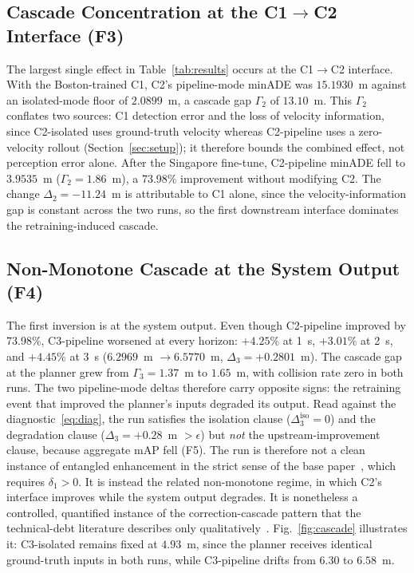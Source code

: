 \documentclass[conference]{IEEEtran}
\begin{document}
\subsection{Cascade Concentration at the C1$\to$C2 Interface (F3)}
The largest single effect in Table~\ref{tab:results} occurs at the C1$\to$C2
interface. With the Boston-trained C1, C2's pipeline-mode minADE was
$15.1930$~m against an isolated-mode floor of $2.0899$~m, a cascade gap
$\Gamma_2$ of $13.10$~m. This $\Gamma_2$ conflates two sources: C1 detection
error and the loss of velocity information, since C2-isolated uses ground-truth
velocity whereas C2-pipeline uses a zero-velocity rollout
(Section~\ref{sec:setup}); it therefore bounds the combined effect, not
perception error alone. After the Singapore fine-tune, C2-pipeline minADE fell
to $3.9535$~m ($\Gamma_2 = 1.86$~m), a 73.98\% improvement without modifying
C2. The change $\Delta_2 = -11.24$~m is attributable to C1 alone, since the
velocity-information gap is constant across the two runs, so the first
downstream interface dominates the retraining-induced cascade.

\subsection{Non-Monotone Cascade at the System Output (F4)}
The first inversion is at the system output. Even though C2-pipeline improved by
73.98\%, C3-pipeline worsened at every horizon: $+4.25\%$ at 1~s, $+3.01\%$ at
2~s, and $+4.45\%$ at 3~s ($6.2969$~m $\to 6.5770$~m, $\Delta_3 = +0.2801$~m).
The cascade gap at the planner grew from $\Gamma_3 = 1.37$~m to $1.65$~m, with
collision rate zero in both runs. The two pipeline-mode deltas therefore carry
opposite signs: the retraining event that improved the planner's inputs degraded
its output. Read against the diagnostic~\eqref{eq:diag}, the run satisfies the
isolation clause ($\Delta_3^{\text{iso}}=0$) and the degradation clause
($\Delta_3 = +0.28$~m $> \epsilon$) but \emph{not} the upstream-improvement
clause, because aggregate mAP fell (F5). The run is therefore not a clean
instance of entangled enhancement in the strict sense of the base
paper~\cite{wang2024compsac}, which requires $\delta_1 > 0$. It is instead the
related non-monotone regime, in which C2's interface improves while the system
output degrades. It is nonetheless a controlled, quantified instance of the
correction-cascade pattern that the technical-debt literature describes only
qualitatively~\cite{sculley2015hidden}. Fig.~\ref{fig:cascade} illustrates it:
C3-isolated remains fixed at $4.93$~m, since the planner receives identical
ground-truth inputs in both runs, while C3-pipeline drifts from $6.30$ to
$6.58$~m.
\end{document}
